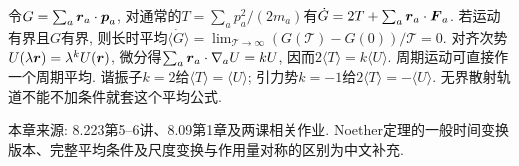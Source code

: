 令$G=\sum_a\boldsymbol{r}_a\cdot\boldsymbol{p}_a$, 对通常的$T=\sum_ap_a^2/(2m_a)$有$\dot G=2T+\sum_a\boldsymbol{r}_a\cdot\boldsymbol{F}_a$. 若运动有界且$G$有界, 则长时平均$\langle\dot G\rangle=\lim_{\mathcal T\to\infty}(G(\mathcal T)-G(0))/\mathcal T=0$. 对齐次势$U(\lambda\boldsymbol{r})=\lambda^kU(\boldsymbol{r})$, 微分得$\sum_a\boldsymbol{r}_a\cdot\nabla_aU=kU$, 因而$2\langle T\rangle=k\langle U\rangle$. 周期运动可直接作一个周期平均. 谐振子$k=2$给$\langle T\rangle=\langle U\rangle$; 引力势$k=-1$给$2\langle T\rangle=-\langle U\rangle$. 无界散射轨道不能不加条件就套这个平均公式.



本章来源: 8.223第5--6讲、8.09第1章及两课相关作业. Noether定理的一般时间变换版本、完整平均条件及尺度变换与作用量对称的区别为中文补充.
